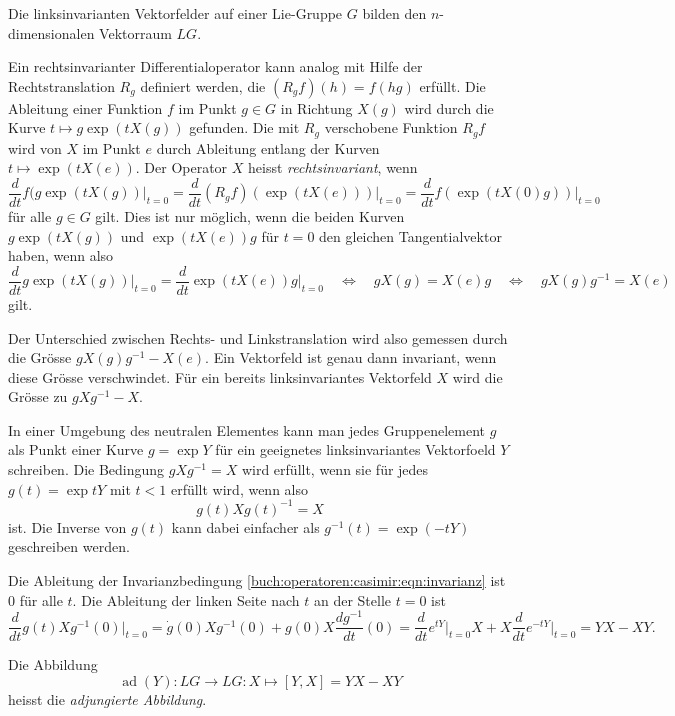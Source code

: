\begin{definition}
Die linksinvarianten Vektorfelder auf einer Lie-Gruppe $G$ bilden 
den $n$-dimensionalen Vektorraum $LG$.
\end{definition}

Ein rechtsinvarianter Differentialoperator kann analog mit Hilfe
der Rechtstranslation $R_g$ definiert werden, die $(R_gf)(h) = f(hg)$
erfüllt.
Die Ableitung einer Funktion $f$ im Punkt $g\in G$ in Richtung $X(g)$
wird durch die Kurve $t\mapsto g\exp(tX(g))$ gefunden.
Die mit $R_g$ verschobene Funktion $R_gf$ wird von $X$ im Punkt $e$
durch Ableitung entlang der Kurven $t\mapsto \exp(tX(e))$.
Der Operator $X$ heisst {\em rechtsinvariant}, wenn 
\[
\frac{d}{dt} f(g\exp(tX(g))\bigg|_{t=0}
=
\frac{d}{dt} (R_gf)(\exp(tX(e)))\bigg|_{t=0}
=
\frac{d}{dt} f(\exp(tX(0)g))\bigg|_{t=0}
\]
für alle $g\in G$ gilt.
Dies ist nur möglich, wenn die beiden Kurven
$g\exp(tX(g))$
und 
$\exp(tX(e))g$
für $t=0$ den gleichen Tangentialvektor haben, wenn also
\[
\frac{d}{dt}g\exp(tX(g))\bigg|_{t=0}
=
\frac{d}{dt}\exp(tX(e))g\bigg|_{t=0}
\quad\Leftrightarrow\quad
gX(g) = X(e)g
\quad\Leftrightarrow\quad
gX(g)g^{-1} = X(e)
\]
gilt.

Der Unterschied zwischen Rechts- und Linkstranslation wird also gemessen
durch die Grösse $gX(g)g^{-1}-X(e)$.
Ein Vektorfeld ist genau dann invariant, wenn diese Grösse verschwindet.
Für ein bereits linksinvariantes Vektorfeld $X$ wird die Grösse zu
$gXg^{-1}-X$.

In einer Umgebung des neutralen Elementes kann man jedes Gruppenelement
$g$ als Punkt einer Kurve $g=\exp Y$ für ein geeignetes linksinvariantes
Vektorfoeld $Y$ schreiben.
Die Bedingung $gXg^{-1}=X$ wird erfüllt, wenn sie für jedes $g(t)=\exp tY$
mit $t<1$ erfüllt wird, wenn also
\begin{equation}
g(t)Xg(t)^{-1}=X
\label{buch:operatoren:casimir:eqn:invarianz}
\end{equation}
ist.
Die Inverse von $g(t)$ kann dabei einfacher als $g^{-1}(t)=\exp(-tY)$
geschreiben werden.

Die Ableitung der Invarianzbedingung
\eqref{buch:operatoren:casimir:eqn:invarianz}
ist $0$ für alle $t$.
Die Ableitung der linken Seite nach $t$ an der Stelle $t=0$ ist
\[
\frac{d}{dt} g(t)Xg^{-1}(0)\bigg|_{t=0}
=
\dot{g}(0)Xg^{-1}(0)
+
g(0) X \frac{dg^{-1}}{dt}(0)
=
\frac{d}{dt}e^{tY}\bigg|_{t=0}
X
+
X
\frac{d}{dt}e^{-tY}\bigg|_{t=0}
=
YX-XY.
\]

\begin{definition}
Die Abbildung
\[
\operatorname{ad}(Y)\colon LG \to LG:X\mapsto [Y,X] = YX-XY
\]
heisst die {\em adjungierte Abbildung}.
\end{definition}

